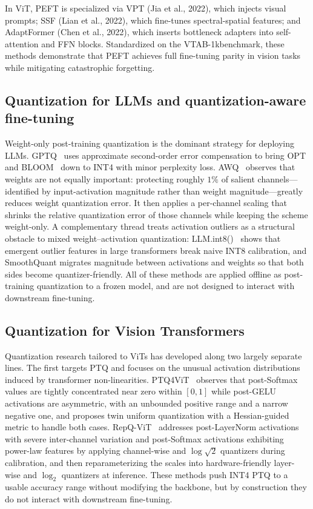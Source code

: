 \documentclass[runningheads]{llncs}
\begin{document}
In \ac{ViT}, \ac{PEFT} is specialized via VPT (Jia et al., 2022), which injects visual prompts; SSF (Lian et al., 2022),
which fine-tunes spectral-spatial features; and AdaptFormer (Chen et al., 2022), which inserts bottleneck adapters into self-attention and FFN blocks.
Standardized on the VTAB-1kbenchmark, these methods demonstrate that PEFT achieves full fine-tuning parity in vision tasks while mitigating catastrophic forgetting.

\subsection{Quantization for LLMs and quantization-aware fine-tuning}
\label{sec:rw:llm_quant}
Weight-only post-training quantization is the dominant strategy for deploying \acp{LLM}.
GPTQ~\cite{frantar2023gptqaccurateposttrainingquantization} uses approximate second-order error compensation to bring OPT~\cite{zhang2022optopenpretrainedtransformer}
and BLOOM~\cite{NEURIPS2022_ce9e92e3} down to INT4 with minor perplexity loss.
AWQ~\cite{MLSYS2024_42a452cb} observes that weights are not equally important: protecting roughly $1\%$ of salient channels---identified by input-activation magnitude rather than weight magnitude---greatly reduces weight quantization error.
It then applies a per-channel scaling that shrinks the relative quantization error of those channels while keeping the scheme weight-only.
A complementary thread treats activation outliers as a structural obstacle to mixed weight--activation quantization:
LLM.int8()~\cite{NEURIPS2022_c3ba4962} shows that emergent outlier features in large transformers break naive INT8 calibration,
and SmoothQuant\cite{pmlr-v202-xiao23c} migrates magnitude between activations and weights so that both sides become quantizer-friendly.
All of these methods are applied offline as post-training quantization to a frozen model,
and are not designed to interact with downstream fine-tuning.

\subsection{Quantization for Vision Transformers}
\label{sec:rw:vit_quant}
Quantization research tailored to ViTs has developed along two largely separate lines.
The first targets \ac{PTQ} and focuses on the unusual activation distributions induced by transformer non-linearities.
PTQ4ViT~\cite{10.1007/978-3-031-19775-8_12} observes that post-Softmax values are tightly concentrated near zero within $[0,1]$ while post-GELU activations are asymmetric,
with an unbounded positive range and a narrow negative one, and proposes twin uniform quantization with a Hessian-guided metric to handle both cases.
RepQ-ViT~\cite{Li_2023_ICCV} addresses post-LayerNorm activations with severe inter-channel variation and post-Softmax activations exhibiting power-law features by applying channel-wise and $\log\sqrt{2}$ quantizers during calibration,
and then reparameterizing the scales into hardware-friendly layer-wise and $\log_2$ quantizers at inference.
These methods push INT4 \ac{PTQ} to a usable accuracy range without modifying the backbone,
but by construction they do not interact with downstream fine-tuning.
\end{document}
